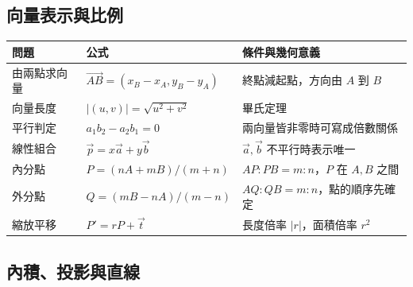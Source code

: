 \documentclass[11pt,a4paper]{article}
\newcounter{none}
\begin{document}
\subsection{向量表示與比例}\label{ux5411ux91cfux8868ux793aux8207ux6bd4ux4f8b}

{\def\LTcaptype{none} %
\begin{longtable}[]{@{}
  >{\raggedright\arraybackslash}p{}
  >{\raggedright\arraybackslash}p{}
  >{\raggedright\arraybackslash}p{}@{}}
\toprule\noalign{}
\begin{minipage}[b]{\linewidth}\raggedright
問題
\end{minipage} & \begin{minipage}[b]{\linewidth}\raggedright
公式
\end{minipage} & \begin{minipage}[b]{\linewidth}\raggedright
條件與幾何意義
\end{minipage} \\
\midrule\noalign{}
\endhead
\bottomrule\noalign{}
\endlastfoot
由兩點求向量 & \(\overrightarrow{AB}=(x_B-x_A,y_B-y_A)\) & 終點減起點，方向由 \(A\) 到 \(B\) \\
向量長度 & \(|(u,v)|=\sqrt{u^2+v^2}\) & 畢氏定理 \\
平行判定 & \(a_1b_2-a_2b_1=0\) & 兩向量皆非零時可寫成倍數關係 \\
線性組合 & \(\vec p=x\vec a+y\vec b\) & \(\vec a,\vec b\) 不平行時表示唯一 \\
內分點 & \(P=(nA+mB)/(m+n)\) & \(AP:PB=m:n\)，\(P\) 在 \(A,B\) 之間 \\
外分點 & \(Q=(mB-nA)/(m-n)\) & \(AQ:QB=m:n\)，點的順序先確定 \\
縮放平移 & \(P'=rP+\vec t\) & 長度倍率 \(|r|\)，面積倍率 \(r^2\) \\
\end{longtable}
}

\subsection{內積、投影與直線}\label{ux5167ux7a4dux6295ux5f71ux8207ux76f4ux7dda}
\end{document}
